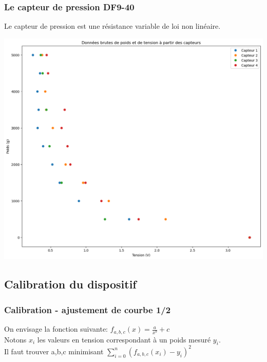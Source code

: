 \begin{frame}
    \frametitle{Le capteur de pression DF9-40}
    Le capteur de pression est une résistance variable de loi non linéaire.
    \begin{center}
        \includegraphics[scale=0.2]{./figures/cal_00.png}
    \end{center}
\end{frame}

\subsection{Calibration du dispositif}
\begin{frame}
    \frametitle{Calibration - ajustement de courbe 1/2}
    On envisage la fonction suivante: $f_{a,b,c}(x) = \frac{a}{x^b}+c$\\
    Notons $x_i$ les valeurs en tension correspondant à un poids mesuré $y_i$.\\
    Il faut trouver a,b,c minimisant $ \sum_{i=0}^{n} (f_{a,b,c}(x_i)-y_i)^2$
\end{frame}

